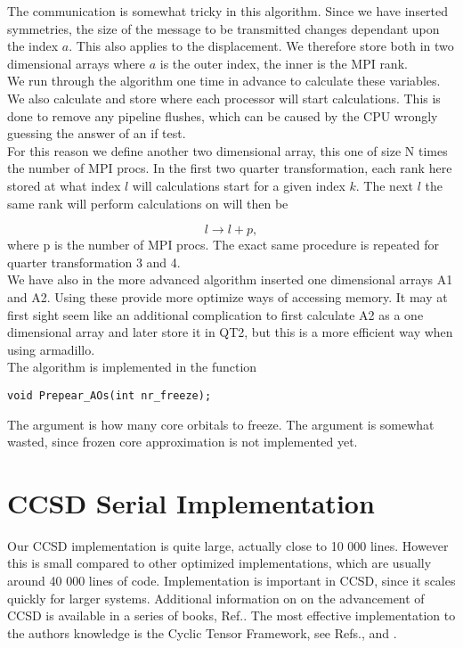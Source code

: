 The communication is somewhat tricky in this algorithm. Since we have inserted symmetries, the size of the message to be transmitted changes dependant upon the index $a$. This also applies to the displacement. We therefore store both in two dimensional arrays where $a$ is the outer index, the inner is the MPI rank. \\

We run through the algorithm one time in advance to calculate these variables. We also calculate and store where each processor will start calculations. This is done to remove any pipeline flushes, which can be caused by the CPU wrongly guessing the answer of an if test. \\

For this reason we define another two dimensional array, this one of size N times the number of MPI procs. In the first two quarter transformation, each rank here stored at what index $l$ will calculations start for a given index $k$. The next $l$ the same rank will perform calculations on will then be 

\begin{equation}
l \rightarrow l + p ,
\end{equation}
where p is the number of MPI procs. The exact same procedure is repeated for quarter transformation 3 and 4. \\

We have also in the more advanced algorithm inserted one dimensional arrays A1 and A2. Using these provide more optimize ways of accessing memory. It may at first sight seem like an additional complication to first calculate A2 as a one dimensional array and later store it in QT2, but this is a more efficient way when using armadillo. \\

The algorithm is implemented in the function 

\begin{lstlisting}
void Prepear_AOs(int nr_freeze);
\end{lstlisting}
The argument is how many core orbitals to freeze. The argument is somewhat wasted, since frozen core approximation is not implemented yet.

\section{CCSD Serial Implementation \label{optimize_serial_version_bii}}
Our CCSD implementation is quite large, actually close to 10 000 lines. However this is small compared to other optimized implementations, which are usually around 40 000 lines of code. Implementation is important in CCSD, since it scales quickly for larger systems. Additional information on on the advancement of CCSD is available in a series of books, Ref.\cite{book_om_advancements_ccsd}. The most effective implementation to the authors knowledge is the Cyclic Tensor Framework, see Refs.\cite{most_effective_ccsd_dude}, \cite{most_effective_ccsd_dude2} and \cite{most_effective_ccsd_dude3}. \\

